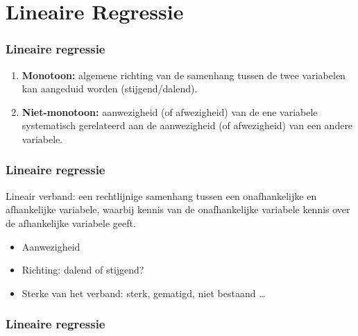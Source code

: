 \documentclass{beamer}
\begin{document}
\section{Lineaire Regressie}
\sectionframelogo{}

\begin{frame}
  \frametitle{Lineaire regressie}


  \begin{enumerate}
    \item \textbf{Monotoon:} algemene richting van de samenhang tussen de twee variabelen kan aangeduid worden (stijgend/dalend).
    \item \textbf{Niet-monotoon:}  aanwezigheid (of afwezigheid) van de ene variabele systematisch gerelateerd aan de aanwezigheid (of afwezigheid) van een andere variabele.
  \end{enumerate}
\end{frame}

\begin{frame}
  \frametitle{Lineaire regressie}
  Lineair verband: een rechtlijnige samenhang tussen een onafhankelijke en afhankelijke variabele, waarbij kennis van de onafhankelijke variabele kennis over de afhankelijke variabele geeft.
  \begin{itemize}
    \item Aanwezigheid
    \item Richting: dalend of stijgend?
    \item Sterke van het verband: sterk, gematigd, niet bestaand \dots
  \end{itemize}
\end{frame}

\begin{frame}
  \frametitle{Lineaire regressie}
  \centering
\end{frame}
\end{document}
